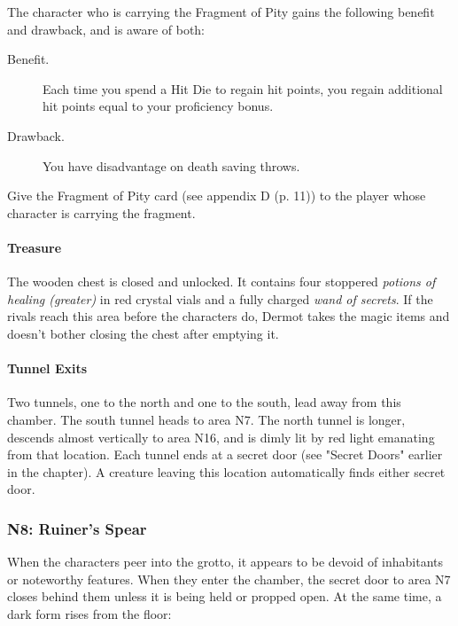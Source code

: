 \documentclass[a4paper, 11pt, bg=full, twocolumn, nooutline]{dndbook}
\begin{document}
The character who is carrying the Fragment of Pity gains the following benefit and drawback, and is aware of both:

\begin{DndSidebar}{}
\begin{description}
\item[Benefit.] Each time you spend a Hit Die to regain hit points, you regain additional hit points equal to your proficiency bonus.
\item[Drawback.] You have disadvantage on death saving throws.
\end{description}
\end{DndSidebar}

Give the Fragment of Pity card (see appendix D (p. 11)) to the player whose character is carrying the fragment.

\paragraph{Treasure}

The wooden chest is closed and unlocked. It contains four stoppered \textit{potions of healing (greater)} in red crystal vials and a fully charged \textit{wand of secrets}. If the rivals reach this area before the characters do, Dermot takes the magic items and doesn't bother closing the chest after emptying it.

\paragraph{Tunnel Exits}

Two tunnels, one to the north and one to the south, lead away from this chamber. The south tunnel heads to area N7. The north tunnel is longer, descends almost vertically to area N16, and is dimly lit by red light emanating from that location. Each tunnel ends at a secret door (see "Secret Doors" earlier in the chapter). A creature leaving this location automatically finds either secret door.

\subsubsection{N8: Ruiner's Spear}

When the characters peer into the grotto, it appears to be devoid of inhabitants or noteworthy features. When they enter the chamber, the secret door to area N7 closes behind them unless it is being held or propped open. At the same time, a dark form rises from the floor:
\end{document}
